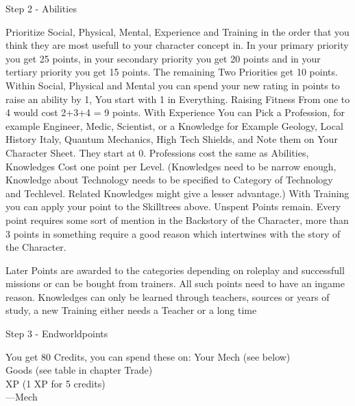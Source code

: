 \documentclass{article}
\newcommand{\subhline}[1]{\begin{center}\large #1 \normalsize \end{center}}
\begin{document}
    \subhline{Step 2 - Abilities}
    Prioritize Social, Physical, Mental, Experience and Training in the order that you think they are most
    usefull to your character concept in. \newline
    In your primary priority you get 25 points, in your secondary priority you get 20 points and in your tertiary
    priority you get 15 points. The remaining Two Priorities get 10 points.\newline
    Within Social, Physical and Mental you can spend your new rating in points to raise an ability by 1, You start with 1
    in Everything. Raising Fitness From one to 4 would cost 2+3+4 = 9 points.\newline
    With Experience You can Pick a Profession, for example Engineer, Medic, Scientist, or a Knowledge for Example
    Geology, Local History Italy, Quantum Mechanics, High Tech Shields, and Note them on Your Character Sheet. They start at
    0. Professions cost the same as Abilities, Knowledges Cost one point per Level. (Knowledges need to be narrow enough,
    Knowledge about Technology needs to be specified to Category of Technology and Techlevel. Related Knowledges might give
    a lesser advantage.)
    With Training you can apply your point to the Skilltrees above.
    Unspent Points remain. Every point requires some sort of mention in the Backstory of the Character, more than 3 points
    in something require a good reason which intertwines with the story of the Character.

    Later Points are awarded to the categories depending on roleplay and successfull missions or can be bought from
    trainers. All such points need to have an ingame reason. Knowledges can only be learned through teachers, sources or
    years of study, a new Training either needs a Teacher or a long time\\


    \subhline{Step 3 - Endworldpoints}
    You get 80 Credits, you can spend these on:
    Your Mech (see below)\\
    Goods (see table in chapter Trade)\\
    XP (1 XP for 5 credits)\\

    ---Mech\newline
\end{document}
